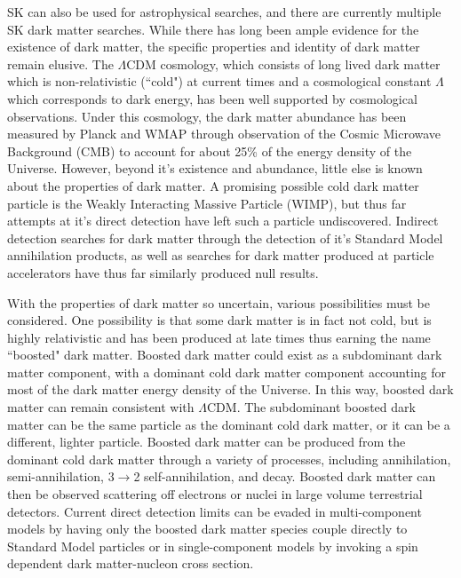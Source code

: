 \documentclass[12pt,oneside,openright]{article}
\begin{document}
SK can also be used for astrophysical searches, and there are currently multiple SK dark matter searches.  While there has long been ample evidence for the existence of dark matter, the specific properties and identity of dark matter remain elusive.  The $\Lambda$CDM cosmology, which consists of long lived dark matter which is non-relativistic (``cold") at current times and a cosmological constant $\Lambda$ which corresponds to dark energy, has been well supported by cosmological observations.  Under this cosmology, the dark matter abundance has been measured by Planck and WMAP through observation of the Cosmic Microwave Background (CMB) to account for about 25\% of the energy density of the Universe.  However, beyond it's existence and abundance, little else is known about the properties of dark matter.  A promising possible cold dark matter particle is the Weakly Interacting Massive Particle (WIMP), but thus far attempts at it's direct detection have left such a particle undiscovered. Indirect detection searches for dark matter through the detection of it's Standard Model annihilation products, as well as searches for dark matter produced at particle accelerators have thus far similarly produced null results.\par   
With the properties of dark matter so uncertain, various possibilities must be considered.  One possibility is that some dark matter is in fact not cold, but is highly relativistic and has been produced at late times thus earning the name ``boosted" dark matter. Boosted dark matter could exist as a subdominant dark matter component, with a dominant cold dark matter component accounting for most of the dark matter energy density of the Universe.  In this way, boosted dark matter can remain consistent with $\Lambda$CDM.  The subdominant boosted dark matter can be the same particle as the dominant cold dark matter, or it can be a different, lighter particle.  Boosted dark matter can be produced from the dominant cold dark matter through a variety of processes, including annihilation, semi-annihilation, 3$\rightarrow$2 self-annihilation, and decay.  Boosted dark matter can then be observed scattering off electrons or nuclei in large volume terrestrial detectors.  Current direct detection limits can be evaded in multi-component models by having only the boosted dark matter species couple directly to Standard Model particles or in single-component models by invoking a spin dependent dark matter-nucleon cross section.
\end{document}
